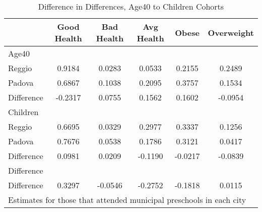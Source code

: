 \begin{table}[htbp]\centering
\caption{Difference in Differences, Age40 to Children Cohorts}
\begin{tabular}{l*{5}{c}}
\hline\hline
            & Good Health&  Bad Health&  Avg Health&       Obese&  Overweight\\
\hline
Age40       &            &            &            &            &            \\
Reggio      &      0.9184&      0.0283&      0.0533&      0.2155&      0.2489\\
Padova      &      0.6867&      0.1038&      0.2095&      0.3757&      0.1534\\
Difference  &     -0.2317&      0.0755&      0.1562&      0.1602&     -0.0954\\
\hline
Children    &            &            &            &            &            \\
Reggio      &      0.6695&      0.0329&      0.2977&      0.3337&      0.1256\\
Padova      &      0.7676&      0.0538&      0.1786&      0.3121&      0.0417\\
Difference  &      0.0981&      0.0209&     -0.1190&     -0.0217&     -0.0839\\
\hline
Difference  &            &            &            &            &            \\
Difference  &      0.3297&     -0.0546&     -0.2752&     -0.1818&      0.0115\\
\hline\hline
\multicolumn{6}{l}{\footnotesize Estimates for those that attended municipal preschools in each city}\\
\end{tabular}
\end{table}
